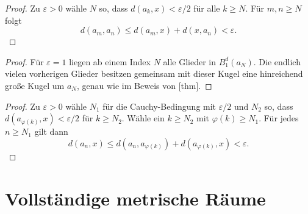 \documentclass[main.tex]{subfiles}
\begin{document}
\begin{proof}
Zu \(\varepsilon>0\) wähle \(N\) so, dass
\(d(a_k,x)<\varepsilon/2\) für alle \(k\geq N\). Für \(m,n\geq N\)
folgt
\[
 d(a_m,a_n)\leq d(a_m,x)+d(x,a_n)<\varepsilon.
\]
\end{proof}

\begin{proof}
Für \(\varepsilon=1\) liegen ab einem Index \(N\) alle Glieder in
\(B_1^d(a_N)\). Die endlich vielen vorherigen Glieder besitzen gemeinsam mit
dieser Kugel eine hinreichend große Kugel um \(a_N\), genau wie im Beweis von
[thm].
\end{proof}

\begin{proof}
Zu \(\varepsilon>0\) wähle \(N_1\) für die Cauchy-Bedingung mit
\(\varepsilon/2\) und \(N_2\) so, dass
\(d(a_{\varphi(k)},x)<\varepsilon/2\) für \(k\geq N_2\). Wähle ein
\(k\geq N_2\) mit \(\varphi(k)\geq N_1\). Für jedes \(n\geq N_1\) gilt
dann
\[
 d(a_n,x)\leq d(a_n,a_{\varphi(k)})
               +d(a_{\varphi(k)},x)<\varepsilon.
\]
\end{proof}

\section{Vollständige metrische Räume}
\end{document}
